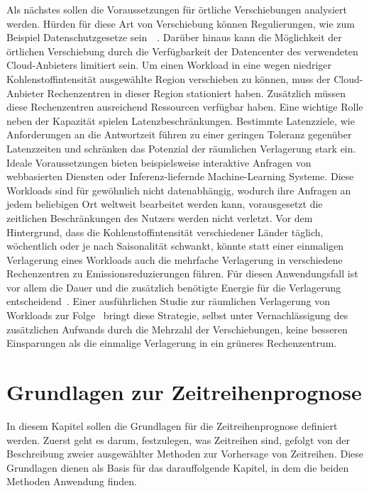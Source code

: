 Als nächstes sollen die Voraussetzungen für örtliche Verschiebungen analysiert werden.
Hürden für diese Art von Verschiebung können Regulierungen, wie zum Beispiel Datenschutzgesetze sein~\cite{Sukprasert.2023}~\cite{Koningstein.18.5.2021}.
Darüber hinaus kann die Möglichkeit der örtlichen Verschiebung durch die Verfügbarkeit der Datencenter des verwendeten Cloud-Anbieters limitiert sein.
Um einen Workload in eine wegen niedriger Kohlenstoffintensität ausgewählte Region verschieben zu können, muss der Cloud-Anbieter Rechenzentren in dieser Region stationiert haben.
Zusätzlich müssen diese Rechenzentren ausreichend Ressourcen verfügbar haben.
Eine wichtige Rolle neben der Kapazität spielen Latenzbeschränkungen.
Bestimmte Latenzziele, wie Anforderungen an die Antwortzeit führen zu einer geringen Toleranz gegenüber Latenzzeiten und schränken das Potenzial der räumlichen Verlagerung stark ein.
Ideale Voraussetzungen bieten beispielsweise interaktive Anfragen von webbasierten Diensten oder Inferenz-liefernde Machine-Learning Systeme.
Diese Workloads sind für gewöhnlich nicht datenabhängig, wodurch ihre Anfragen an jedem beliebigen Ort weltweit bearbeitet werden kann, vorausgesetzt die zeitlichen Beschränkungen des Nutzers werden nicht verletzt.
Vor dem Hintergrund, dass die Kohlenstoffintensität verschiedener Länder täglich, wöchentlich oder je nach Saisonalität schwankt, könnte statt einer einmaligen Verlagerung eines Workloads auch die mehrfache Verlagerung in verschiedene Rechenzentren zu Emissionsreduzierungen führen.
Für diesen Anwendungsfall ist vor allem die Dauer und die zusätzlich benötigte Energie für die Verlagerung entscheidend~\cite{Sukprasert.2023}.
Einer ausführlichen Studie zur räumlichen Verlagerung von Workloads zur Folge~\cite{Sukprasert.2023} bringt diese Strategie, selbst unter Vernachlässigung des zusätzlichen Aufwands durch die Mehrzahl der Verschiebungen, keine besseren Einsparungen als die einmalige Verlagerung in ein grüneres Rechenzentrum.
\chapter{Grundlagen zur Zeitreihenprognose}\label{CAP:tsf_basics}
In diesem Kapitel sollen die Grundlagen für die Zeitreihenprognose definiert werden.
Zuerst geht es darum, festzulegen, was Zeitreihen sind, gefolgt von der Beschreibung zweier ausgewählter Methoden zur Vorhersage von Zeitreihen.
Diese Grundlagen dienen als Basis für das darauffolgende Kapitel, in dem die beiden Methoden Anwendung finden.
